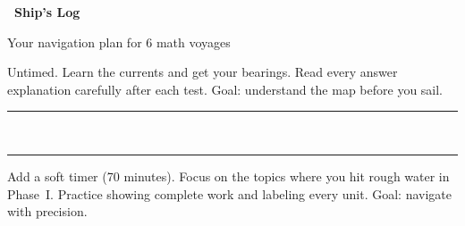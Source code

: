 
\thispagestyle{empty}

{
\sffamily

\begin{center}
    \textcolor{navDeep}{\fontsize{26}{30}\selectfont\bfseries
    \faMap~Ship's Log~\faMap}

    \smallskip
    \textcolor{navStorm}{\normalsize Your navigation plan for 6 math voyages}
\end{center}

\vspace{2mm}

\noindent
\begin{tcolorbox}[
    enhanced,
    colback=navWave,
    colframe=navTeal!50,
    arc=4pt, boxrule=1.5pt,
    left=5mm, right=5mm, top=3mm, bottom=3mm,
    title={\textcolor{white}{Voyage I: Coastal Waters (Tests 1--2)}},
    colbacktitle=navTeal!75,
    fonttitle=\bfseries\sffamily,
    borderline west={3pt}{0pt}{navTeal!60},
]
    \small
    Untimed. Learn the currents and get your bearings.
    Read every answer explanation carefully after each test.
    Goal: understand the map before you sail.
\end{tcolorbox}

\vspace{1mm}
\begin{center}
    \textcolor{navTeal!30}{\rule{0.3\linewidth}{0.4pt}}
    \textcolor{navTeal!50}{~\faAngleDoubleDown~}
    \textcolor{navTeal!30}{\rule{0.3\linewidth}{0.4pt}}
\end{center}
\vspace{1mm}

\noindent
\begin{tcolorbox}[
    enhanced,
    colback=navGoldLight,
    colframe=navGold!50,
    arc=4pt, boxrule=1.5pt,
    left=5mm, right=5mm, top=3mm, bottom=3mm,
    title={\textcolor{white}{Voyage II: Open Sea (Tests 3--4)}},
    colbacktitle=navGold!70,
    fonttitle=\bfseries\sffamily,
    borderline west={3pt}{0pt}{navGold!60},
]
    \small
    Add a soft timer (70 minutes). Focus on the topics where
    you hit rough water in Phase~I. Practice showing complete
    work and labeling every unit.
    Goal: navigate with precision.
\end{tcolorbox}

}
